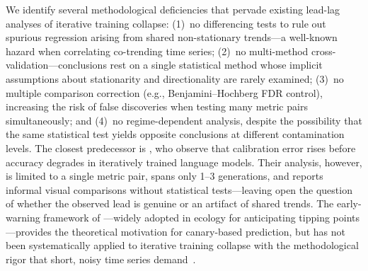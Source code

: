 We identify several methodological deficiencies that pervade existing lead-lag analyses of iterative training collapse:
(1)~no differencing tests to rule out spurious regression arising from shared non-stationary trends---a well-known hazard when correlating co-trending time series;
(2)~no multi-method cross-validation---conclusions rest on a single statistical method whose implicit assumptions about stationarity and directionality are rarely examined;
(3)~no multiple comparison correction (e.g., Benjamini--Hochberg FDR control), increasing the risk of false discoveries when testing many metric pairs simultaneously; and
(4)~no regime-dependent analysis, despite the possibility that the same statistical test yields opposite conclusions at different contamination levels.
The closest predecessor is \citet{du2026geometric}, who observe that calibration error rises before accuracy degrades in iteratively trained language models.
Their analysis, however, is limited to a single metric pair, spans only 1--3 generations, and reports informal visual comparisons without statistical tests---leaving open the question of whether the observed lead is genuine or an artifact of shared trends.
The early-warning framework of \citet{scheffer2009early,scheffer2012anticipating}---widely adopted in ecology for anticipating tipping points---provides the theoretical motivation for canary-based prediction, but has not been systematically applied to iterative training collapse with the methodological rigor that short, noisy time series demand~\cite{boettiger2012limits}.

